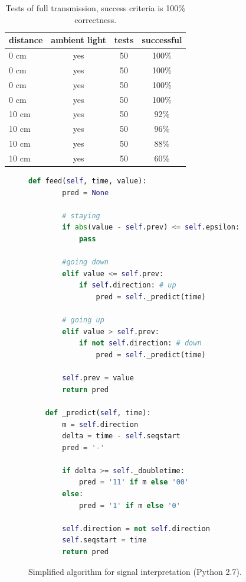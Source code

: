 \begin{table}[hbt]
\centering
  \begin{tabular}{l c c c}
    distance & ambient light & tests & successful \\
    \hline
   0 cm & yes & 50 & 100\% \\
   0 cm & yes & 50 & 100\% \\
   0 cm & yes & 50 & 100\% \\
   0 cm & yes & 50 & 100\% \\
   10 cm & yes & 50 & 92\% \\
   10 cm & yes & 50 & 96\% \\
   10 cm & yes & 50 & 88\% \\
   10 cm & yes & 50 & 60\% \\
  \end{tabular}
  \caption{Tests of full transmission, success criteria is 100\% correctness.}
  \label{tab:txresults}
\end{table}


\begin{figure}
\centering
\begin{lstlisting}[language=Python, frame={}]
	def feed(self, time, value):
		pred = None
		
		# staying
		if abs(value - self.prev) <= self.epsilon:
			pass

		#going down
		elif value <= self.prev: 
			if self.direction: # up	
				pred = self._predict(time)

		# going up
		elif value > self.prev: 
			if not self.direction: # down
				pred = self._predict(time)

		self.prev = value
		return pred
		
	def _predict(self, time):
		m = self.direction
		delta = time - self.seqstart
		pred = '-'
		
		if delta >= self._doubletime:
			pred = '11' if m else '00'
		else:
			pred = '1' if m else '0'

		self.direction = not self.direction
		self.seqstart = time
		return pred
\end{lstlisting}
\caption{Simplified algorithm for signal interpretation (Python 2.7).}
\label{code}
\end{figure}